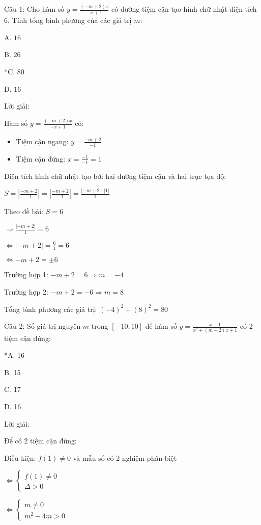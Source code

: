 \documentclass{article}
\begin{document}
Câu 1: Cho hàm số \(y = \frac{(-m + 2)x}{-x + 1}\) có đường tiệm cận tạo hình chữ nhật diện tích 6. Tính tổng bình phương của các giá trị \(m\):

A. \(16\)

B. \(26\)

*C. \(80\)

D. \(16\)

Lời giải:

Hàm số \(y = \frac{(-m + 2)x}{-x + 1}\) có:

\begin{itemize}
\item Tiệm cận ngang: \(y = \frac{-m + 2}{-1}\)
\item Tiệm cận đứng: \(x = \frac{-1}{-1} = 1\)
\end{itemize}

Diện tích hình chữ nhật tạo bởi hai đường tiệm cận và hai trục tọa độ:

\(S = \left| \frac{-m + 2}{-1} \right| = \left| \frac{-m + 2}{-1} \right| = \frac{|-m + 2| \cdot |1|}{1}\)

Theo đề bài: \(S = 6\)

\(\Rightarrow \frac{|-m + 2|}{1} = 6\)

\(\Leftrightarrow |-m + 2| = \frac{6}{1} = 6\)

\(\Leftrightarrow -m + 2 = \pm 6\)

Trường hợp 1: \(-m + 2 = 6 \Rightarrow m = -4\)

Trường hợp 2: \(-m + 2 = -6 \Rightarrow m = 8\)

Tổng bình phương các giá trị: \((-4)^2 + (8)^2 = 80\)



Câu 2: Số giá trị nguyên \(m\) trong \([-10; 10]\) để hàm số \(y = \frac{x - 1}{x^2 + (m - 2)x + 1}\) có 2 tiệm cận đứng:

*A. 16

B. 15

C. 17

D. 16

Lời giải:

Để có 2 tiệm cận đứng:

Điều kiện: \(f(1) \neq 0\) và mẫu số có 2 nghiệm phân biệt

\(\Leftrightarrow \begin{cases}
f(1) \neq 0 \\
\Delta > 0
\end{cases}\)

\(\Leftrightarrow \begin{cases}
m \neq 0 \\
m^2 - 4m > 0
\end{cases}\)
\end{document}
